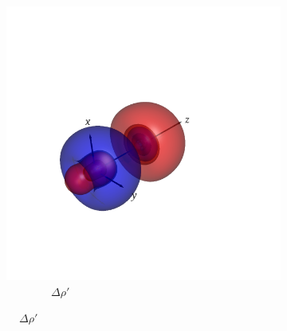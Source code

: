 \documentclass[journal=inoraj,manuscript=article]{achemso}
\begin{document}
\begin{figure}[!h]
    \centering
    \centering
    \begin{subfigure}[t]{0.30\textwidth}
        \centering
        \includegraphics[width=0.80*\linewidth]{./AuHg+/diff_tot.png} 
        \caption*{\ \ \ \ \ \ \ \ $\Delta \rho'$} 
    \end{subfigure}
    \hfill
 

\end{figure}
\end{document}
